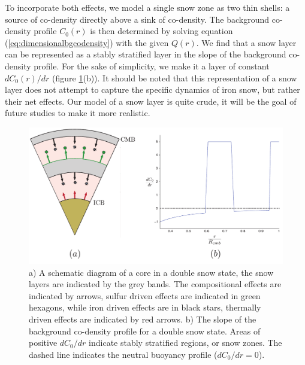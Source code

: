 To incorporate both effects, we model a single snow zone as two thin shells: a source of co-density directly above a sink of co-density. The background co-density profile $C_{0}\left(r\right)$ is then determined by solving equation (\ref{eq:dimensionalbgcodensity}) with the given $Q\left(r\right)$. We find that a snow layer can be represented as a stably stratified layer in the slope of the background co-density profile. For the sake of simplicity, we make it a layer of constant $d C_{0}\left(r\right)/dr$ (figure \ref{fig:setup}(b)). It should be noted that this representation of a snow layer does not attempt to capture the specific dynamics of iron snow, but rather their net effects. Our model of a snow layer is quite crude, it will be the goal of future studies to make it more realistic.
\begin{figure}
	\centering
	\noindent\includegraphics[width=40pc]{Chapter4/figures/setup.pdf}
	\caption{a) A schematic diagram of a core in a double snow state, the snow layers are indicated by the grey bands. The compositional effects are indicated by arrows, sulfur driven effects are indicated in green hexagons, while iron driven effects are in black stars, thermally driven effects are indicated by red arrows. b) The slope of the background co-density profile for a double snow state. Areas of positive $dC_{0}/dr$ indicate stably stratified regions, or snow zones. The dashed line indicates the neutral buoyancy profile ($dC_{0}/dr=0$).}
	\label{fig:setup}
\end{figure}

